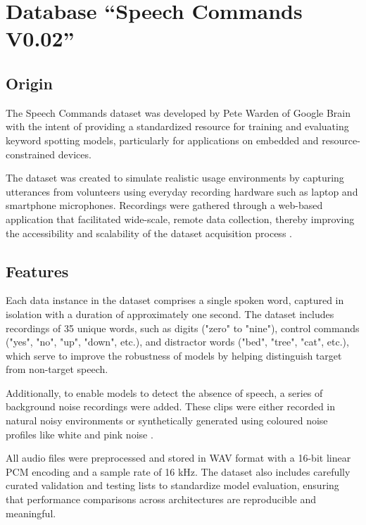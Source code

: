 %
%

\chapter{Database ``Speech Commands V0.02''}

\section{Origin}

The Speech Commands dataset was developed by Pete Warden of Google Brain with the intent of providing a standardized resource for training and evaluating keyword spotting models, particularly for applications on embedded and resource-constrained devices.

\bigskip

The dataset was created to simulate realistic usage environments by capturing utterances from volunteers using everyday recording hardware such as laptop and smartphone microphones. Recordings were gathered through a web-based application that facilitated wide-scale, remote data collection, thereby improving the accessibility and scalability of the dataset acquisition process \cite{Warden:2020}.

\section{Features}

Each data instance in the dataset comprises a single spoken word, captured in isolation with a duration of approximately one second. The dataset includes recordings of 35 unique words, such as digits ("zero" to "nine"), control commands ("yes", "no", "up", "down", etc.), and distractor words ("bed", "tree", "cat", etc.), which serve to improve the robustness of models by helping distinguish target from non-target speech.

\bigskip

Additionally, to enable models to detect the absence of speech, a series of background noise recordings were added. These clips were either recorded in natural noisy environments or synthetically generated using coloured noise profiles like white and pink noise \cite{Warden:2020}.

\bigskip

All audio files were preprocessed and stored in WAV format with a 16-bit linear PCM encoding and a sample rate of 16 kHz. The dataset also includes carefully curated validation and testing lists to standardize model evaluation, ensuring that performance comparisons across architectures are reproducible and meaningful.

